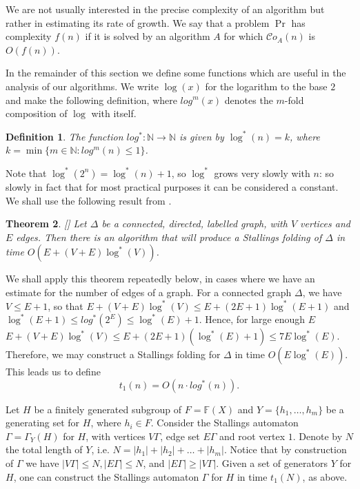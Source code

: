 \documentclass[a4paper,12pt]{article}
\newcommand{\G}{\Gamma }
\newcommand{\D}{\Delta }
\newtheorem{theorem}{Theorem}[section]
\newtheorem{definition}[theorem]{Definition}
\numberwithin{equation}{section}
\numberwithin{figure}{section}
\newcommand{\NN}{\ensuremath{\mathbb{N}}}
\newcommand{\FF}{\ensuremath{\mathbb{F}}}
\newcommand{\cC}{\mathcal{C}}
\newcommand{\maps}{\rightarrow}
\begin{document}
We are not usually interested in the precise complexity of an algorithm
but rather in estimating its rate of growth. We say that a problem
$\Pr$ has  complexity $f(n)$ if it is solved by an
algorithm $A$ for which $\cC o_{A}(n)$ is $O(f(n))$.

In the remainder of this section we define some functions which are useful
in the analysis of our algorithms. We write $\log(x)$ for the logarithm to the base $2$ and make the
following definition, where $log^m(x)$ denotes the $m$-fold composition
of $\log$ with itself.
\begin{definition}\label{def:log}
The function $log^*:\NN\maps \NN$ is given by $\log^*(n)=k$, where
$k=\min\{m\in \NN: log^m(n)\le 1\}$.
\end{definition}
Note that $\log^*(2^n)=\log^*(n)+1$, so $\log^*$ grows very slowly with $n$:
so slowly in fact that for most practical purposes it can be
considered a constant.
We shall use the following result from \cite{touikan06}.
\begin{theorem}\label{th:toui}[{\cite[Theorem 1.6]{touikan06}}]%
Let $\D$ be a connected, directed, labelled graph, with $V$ vertices and
$E$ edges. Then there is an algorithm that will produce a Stallings folding of
$\D$ in time $O(E+(V+E)\log^*(V))$.
\end{theorem}

We shall apply this theorem repeatedly below, in cases where we
have an estimate for the number of edges of a graph. For a
connected graph $\D$, we have $V\le E+1$, so that
$E+(V+E)\log^*(V)\le E+(2E+1)\log^*(E+1)$ and $\log^*(E+1)\le
log^*(2^E)\le \log^*(E)+1$. Hence, for large enough $E$
$E+(V+E)\log^*(V)\le E+(2E+1)(\log^*(E)+1)\le 7E\log^*(E)$.
Therefore, we may construct a Stallings folding for $\D$ in time
$O(E\log^*(E))$. This leads us to define
\begin{equation}\label{t1} t_1(n) = O (n \cdot log^{\ast}(n)).
\end{equation}

Let $H$ be a finitely generated subgroup of $F=\FF(X)$ and
$Y=\{h_1,\ldots ,h_m\}$ be a generating set for $H$, where $h_i\in
F$. Consider the Stallings automaton $\G = \G_Y(H)$ for $H$, with
vertices $V\G$, edge set $E\G$ and root vertex $1$. Denote by
$N$ the total length of $Y$, i.e. $N = |h_1| + |h_2| + \ldots +
|h_m|$. Notice that by construction of $\G$ we have $|V\G| \le N,
|E\G| \le N$, and $|E \G| \ge |V \G|$.
Given a set of generators $Y$ for $H$, one can construct the
Stallings automaton $\G$ for $H$ in time $t_1(N)$, as above.
\end{document}
